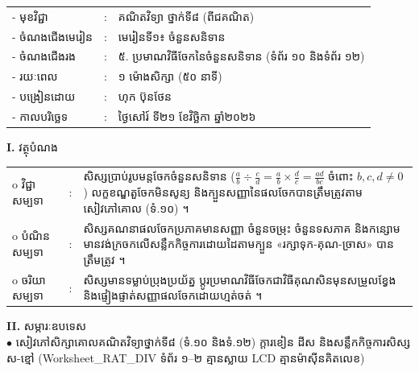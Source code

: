 \documentclass[a4paper,10pt]{article}
\newcommand{\wcirc}{{\CourierBullet\fontsize{9.5pt}{11pt}\selectfont o}}
\newcommand{\en}[1]{{\TimesEn #1}}
\begin{document}
{\renewcommand{\arraystretch}{0.98}
\hspace*{3.1cm}%
\begin{tabular}{@{}l l L{11.0cm}@{}}
  - \hspace{0.35cm} មុខវិជ្ជា & : & គណិតវិទ្យា ថ្នាក់ទី៨ (ពីជគណិត) \\
  - \hspace{0.35cm} ចំណងជើងមេរៀន & : & មេរៀនទី១៖ ចំនួនសនិទាន \\
  - \hspace{0.35cm} ចំណងជើងរង & : & ៥. ប្រមាណវិធីចែកនៃចំនួនសនិទាន (ទំព័រ ១០ និងទំព័រ ១២) \\
  - \hspace{0.35cm} រយៈពេល & : & ១ ម៉ោងសិក្សា (៥០ នាទី) \\
  - \hspace{0.35cm} បង្រៀនដោយ & : & ហុក ប៊ុនថែន \\
  - \hspace{0.35cm} កាលបរិច្ឆេទ & : & ថ្ងៃសៅរ៍ ទី២១ ខែវិច្ឆិកា ឆ្នាំ២០២៦ \\
\end{tabular}

\vspace{2pt}

\textbf{I.} {\muol វត្ថុបំណង}\\[1pt]
\hspace*{0.55cm}%
\begin{tabular}{@{}l l L{14.2cm}@{}}
  \wcirc \hspace{0.25cm} វិជ្ជាសម្បទា & : & សិស្សប្រាប់រូបមន្តចែកចំនួនសនិទាន ($\frac{a}{b}\div\frac{c}{d}=\frac{a}{b}\times\frac{d}{c}=\frac{ad}{bc}$ ចំពោះ $b,c,d\neq 0$) លក្ខខណ្ឌតួចែកមិនសូន្យ និងក្បួនសញ្ញានៃផលចែកបានត្រឹមត្រូវតាមសៀវភៅគោល (ទំ.១០) ។ \\
  \wcirc \hspace{0.25cm} បំណិនសម្បទា & : & សិស្សគណនាផលចែកប្រភាគមានសញ្ញា ចំនួនចម្រុះ ចំនួនទសភាគ និងកន្សោមមានវង់ក្រចកលើសន្លឹកកិច្ចការដោយដៃតាមក្បួន «រក្សាទុក-គុណ-ច្រាស» បានត្រឹមត្រូវ ។ \\
  \wcirc \hspace{0.25cm} ចរិយាសម្បទា & : & សិស្សមានទម្លាប់ប្រុងប្រយ័ត្ន ប្ដូរប្រមាណវិធីចែកជាវិធីគុណសិនមុនសម្រួលខ្វែង និងផ្ទៀងផ្ទាត់សញ្ញាផលចែកដោយហ្មត់ចត់ ។ \\
\end{tabular}

\vspace{2pt}

\textbf{II.} {\muol សម្ភារៈឧបទេស}\\[1pt]
\hspace*{0.55cm}$\bullet$ \hspace{0.35cm} សៀវភៅសិក្សាគោលគណិតវិទ្យាថ្នាក់ទី៨ (ទំ.១០ និងទំ.១២) ក្ដារខៀន ដីស និងសន្លឹកកិច្ចការសិស្ស ស-ខ្មៅ (\en{Worksheet\_RAT\_DIV} ទំព័រ ១–២ គ្មានស្លាយ \en{LCD} គ្មានម៉ាស៊ីនគិតលេខ)

}
\end{document}
